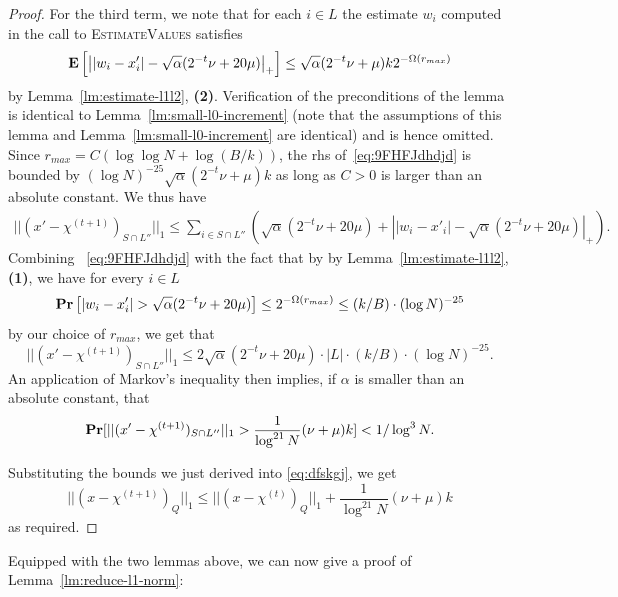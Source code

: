 \begin{proof}
For the third term, we note that for each $i\in L$ the estimate $w_i$ computed in the call to \textsc{EstimateValues} satisfies
\begin{equation}\label{eq:9FHFJdhdjd}
{\bf \mbox{\bf E}}\left[\left||w_i-x'_i|-\sqrt{\alpha}(2^{-t}\nu+20\mu)\right|_+\right]\leq \sqrt{\alpha}(2^{-t}\nu+\mu)k2^{-\Omega(r_{max})} 
\end{equation}
by Lemma~\ref{lm:estimate-l1l2}, {\bf (2)}. Verification of the preconditions of the lemma is identical to Lemma~\ref{lm:small-l0-increment} (note that the assumptions of this lemma and Lemma~\ref{lm:small-l0-increment} are identical) and is hence omitted. Since $r_{max}=C(\log\log N+\log (B/k))$, the rhs of~\eqref{eq:9FHFJdhdjd} is bounded by $(\log N)^{-25} \sqrt{\alpha}(2^{-t}\nu+\mu)k$ as long as $C>0$ is larger than an absolute constant. 
We thus have
\begin{equation*}
\begin{split}
||(x'-\chi^{(t+1)})_{S\cap L''}||_1\leq \sum_{i\in S\cap L''} \left(\sqrt{\alpha}(2^{-t}\nu+20\mu)+\left||w_i-x'_i|-\sqrt{\alpha}(2^{-t}\nu+20\mu)\right|_+\right).
\end{split}
\end{equation*}
Combining ~\eqref{eq:9FHFJdhdjd} with the fact that by by Lemma~\ref{lm:estimate-l1l2}, {\bf (1)}, we have for every $i\in L$ 
$$
\prob\left[|w_i-x'_i|>\sqrt{\alpha}(2^{-t}\nu+20\mu)\right]\leq 2^{-\Omega(r_{max})}\leq (k/B)\cdot (\log N)^{-25}
$$
by our choice of $r_{max}$, we get that
$$
||(x'-\chi^{(t+1)})_{S\cap L''}||_1\leq  2\sqrt{\alpha}(2^{-t}\nu+20\mu)\cdot|L|\cdot (k/B)\cdot (\log N)^{-25}.
$$
An application of Markov's inequality then implies, if $\alpha$ is smaller than an absolute constant, that 
$$
{\bf \mbox{\bf Pr}}[||(x'-\chi^{(t+1)})_{S\cap L''}||_1> \frac1{\log^{21} N}(\nu+\mu)k]<1/\log^3 N.
$$

Substituting the bounds we just derived into \eqref{eq:dfskgj}, we get
$$
||(x-\chi^{(t+1)})_Q||_1\leq ||(x-\chi^{(t)})_Q||_1+\frac1{\log^{21} N}(\nu+\mu)k
$$
as required.


\end{proof}



Equipped with the two lemmas above, we can now give a proof of Lemma~\ref{lm:reduce-l1-norm}:

